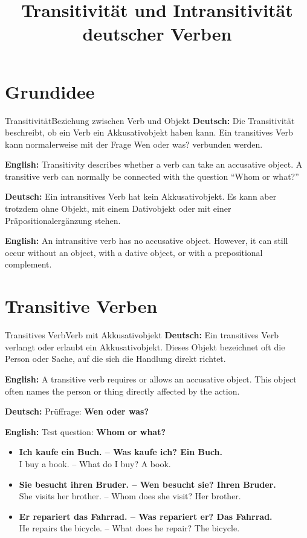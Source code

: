 \documentclass[a4paper,11pt]{article}
\title{Transitivität und Intransitivität deutscher Verben}
\date{}
\newcommand{\GermanText}[1]{\textbf{Deutsch: }#1\par}
\newcommand{\EnglishText}[1]{{\small\color{SoftGray}\textbf{English: }#1\par}}
\newcommand{\ExampleItem}[2]{\item \textbf{#1}\\{\small\color{SoftGray}#2}}
\begin{document}
    \maketitle
    \tableofcontents
    \newpage
    
    
    \section{Grundidee}
        
        \begin{grammarentry}{Transitivität}{Beziehung zwischen Verb und Objekt}
            \GermanText{Die Transitivität beschreibt, ob ein Verb ein Akkusativobjekt haben kann. Ein transitives Verb kann normalerweise mit der Frage \glqq Wen oder was?\grqq{} verbunden werden.}
            \EnglishText{Transitivity describes whether a verb can take an accusative object. A transitive verb can normally be connected with the question ``Whom or what?''}
            
            \GermanText{Ein intransitives Verb hat kein Akkusativobjekt. Es kann aber trotzdem ohne Objekt, mit einem Dativobjekt oder mit einer Präpositionalergänzung stehen.}
            \EnglishText{An intransitive verb has no accusative object. However, it can still occur without an object, with a dative object, or with a prepositional complement.}
        \end{grammarentry}
    
    
    \section{Transitive Verben}
        
        \begin{grammarentry}{Transitives Verb}{Verb mit Akkusativobjekt}
            \GermanText{Ein transitives Verb verlangt oder erlaubt ein Akkusativobjekt. Dieses Objekt bezeichnet oft die Person oder Sache, auf die sich die Handlung direkt richtet.}
            \EnglishText{A transitive verb requires or allows an accusative object. This object often names the person or thing directly affected by the action.}
            
            \GermanText{Prüffrage: \textbf{Wen oder was?}}
            \EnglishText{Test question: \textbf{Whom or what?}}
        \end{grammarentry}
        
        \begin{exbox}
            \begin{itemize}
                \ExampleItem{Ich kaufe ein Buch. -- Was kaufe ich? Ein Buch.}{I buy a book. -- What do I buy? A book.}
                \ExampleItem{Sie besucht ihren Bruder. -- Wen besucht sie? Ihren Bruder.}{She visits her brother. -- Whom does she visit? Her brother.}
                \ExampleItem{Er repariert das Fahrrad. -- Was repariert er? Das Fahrrad.}{He repairs the bicycle. -- What does he repair? The bicycle.}
            \end{itemize}
        \end{exbox}
    
\end{document}
